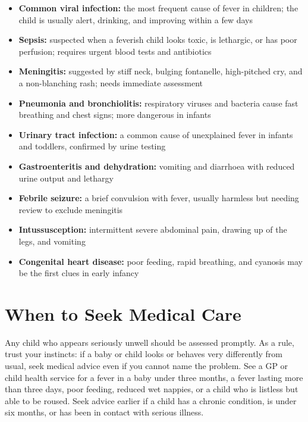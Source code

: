 \begin{itemize}
    \item \textbf{Common viral infection:} the most frequent cause of fever in children; the child is usually alert, drinking, and improving within a few days
    \item \textbf{Sepsis:} suspected when a feverish child looks toxic, is lethargic, or has poor perfusion; requires urgent blood tests and antibiotics
    \item \textbf{Meningitis:} suggested by stiff neck, bulging fontanelle, high-pitched cry, and a non-blanching rash; needs immediate assessment
    \item \textbf{Pneumonia and bronchiolitis:} respiratory viruses and bacteria cause fast breathing and chest signs; more dangerous in infants
    \item \textbf{Urinary tract infection:} a common cause of unexplained fever in infants and toddlers, confirmed by urine testing
    \item \textbf{Gastroenteritis and dehydration:} vomiting and diarrhoea with reduced urine output and lethargy
    \item \textbf{Febrile seizure:} a brief convulsion with fever, usually harmless but needing review to exclude meningitis
    \item \textbf{Intussusception:} intermittent severe abdominal pain, drawing up of the legs, and vomiting
    \item \textbf{Congenital heart disease:} poor feeding, rapid breathing, and cyanosis may be the first clues in early infancy
\end{itemize}

\section*{When to Seek Medical Care}
Any child who appears seriously unwell should be assessed promptly. As a rule, trust your instincts: if a baby or child looks or behaves very differently from usual, seek medical advice even if you cannot name the problem. See a GP or child health service for a fever in a baby under three months, a fever lasting more than three days, poor feeding, reduced wet nappies, or a child who is listless but able to be roused. Seek advice earlier if a child has a chronic condition, is under six months, or has been in contact with serious illness.

